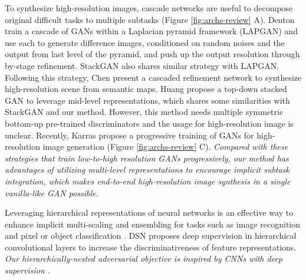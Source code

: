 \documentclass[10pt,twocolumn,letterpaper]{article}
\begin{document}
To synthesize high-resolution images, cascade networks are useful to decompose original difficult tasks to multiple subtasks (Figure \ref{fig:archs-review} A).
Denton \etal \cite{denton2015deep} train a cascade of GANs within a Laplacian pyramid framework (LAPGAN) and use each to generate difference images, conditioned on random noises and the output from last level of the pyramid, and push up the output resolution through by-stage refinement. StackGAN also shares similar strategy with LAPGAN. Following this strategy, Chen \etal \cite{chen2017photographic} present a cascaded refinement network to synthesize high-resolution scene from semantic maps. 
Huang \etal \cite{huang2016stacked}
propose a top-down stacked GAN to leverage mid-level representations, which shares some similarities with StackGAN and our method. However, this method needs multiple symmetric bottom-up pre-trained discriminators and the usage for high-resolution image is unclear. Recently, Karras \etal \cite{Karras2017progressive} propose a progressive training of GANs for high-resolution image generation (Figure \ref{fig:archs-review} C). \textit{Compared with these strategies that train low-to-high resolution GANs progressively, our method has advantages of utilizing multi-level representations to encourage implicit subtask integration, which makes end-to-end high-resolution image synthesis in a single vanilla-like GAN possible.}


Leveraging hierarchical representations of neural networks is an effective way to enhance implicit multi-scaling and ensembling for tasks such as image recognition \cite{lee2015deeply} and pixel or object classification \cite{xie2015holistically,cai2016unified,long2015fully}. DSN \cite{lee2015deeply} proposes deep supervision in hierarchical convolutional layers to increase the discriminativeness of feature representations. 
\textit{Our hierarchically-nested adversarial objective is inspired by CNNs with deep supervision \cite{lee2015deeply,xie2015holistically}. }

%
%
\end{document}
